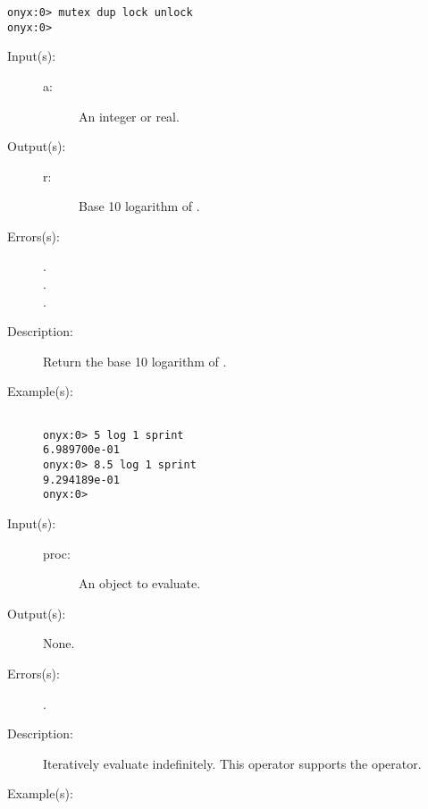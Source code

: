 \begin{description}
\begin{description}
\begin{verbatim}
onyx:0> mutex dup lock unlock
onyx:0>
		\end{verbatim}
	\end{description}
\label{systemdict:log}
\item[{\onyxop{a}{log}{r}}: ]
	\begin{description}\item[]
	\item[Input(s): ]
		\begin{description}\item[]
		\item[a: ]
			An integer or real.
		\end{description}
	\item[Output(s): ]
		\begin{description}\item[]
		\item[r: ]
			Base 10 logarithm of .
		\end{description}
	\item[Errors(s): ]
		\begin{description}\item[]
		\item[.]
		\item[.]
		\item[.]
		\end{description}
	\item[Description: ]
		Return the base 10 logarithm of .
	\item[Example(s): ]\begin{verbatim}

onyx:0> 5 log 1 sprint
6.989700e-01
onyx:0> 8.5 log 1 sprint
9.294189e-01
onyx:0>
		\end{verbatim}
	\end{description}
\label{systemdict:loop}
\item[{\onyxop{proc}{loop}{--}}: ]
	\begin{description}\item[]
	\item[Input(s): ]
		\begin{description}\item[]
		\item[proc: ]
			An object to evaluate.
		\end{description}
	\item[Output(s): ] None.
	\item[Errors(s): ]
		\begin{description}\item[]
		\item[.]
		\end{description}
	\item[Description: ]
		Iteratively evaluate  indefinitely.  This operator
		supports the 
		operator.
	\item[Example(s): ]\begin{verbatim}


\end{verbatim}
\end{description}
\end{description}
